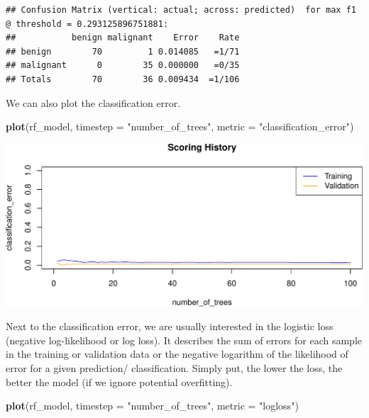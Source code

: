 \documentclass[]{article}
\newenvironment{Shaded}{\begin{snugshade}}{\end{snugshade}}
\newcommand{\KeywordTok}[1]{\textcolor[rgb]{0.13,0.29,0.53}{\textbf{{#1}}}}
\newcommand{\DataTypeTok}[1]{\textcolor[rgb]{0.13,0.29,0.53}{{#1}}}
\newcommand{\StringTok}[1]{\textcolor[rgb]{0.31,0.60,0.02}{{#1}}}
\newcommand{\NormalTok}[1]{{#1}}
\begin{document}
\begin{verbatim}
## Confusion Matrix (vertical: actual; across: predicted)  for max f1 @ threshold = 0.293125896751881:
##           benign malignant    Error    Rate
## benign        70         1 0.014085   =1/71
## malignant      0        35 0.000000   =0/35
## Totals        70        36 0.009434  =1/106
\end{verbatim}

We can also plot the classification error.

\begin{Shaded}
\begin{Highlighting}[]
\KeywordTok{plot}\NormalTok{(rf_model,}
     \DataTypeTok{timestep =} \StringTok{"number_of_trees"}\NormalTok{,}
     \DataTypeTok{metric =} \StringTok{"classification_error"}\NormalTok{)}
\end{Highlighting}
\end{Shaded}

\begin{center}\includegraphics{webinar_code_files/figure-latex/unnamed-chunk-44-1} \end{center}

Next to the classification error, we are usually interested in the
logistic loss (negative log-likelihood or log loss). It describes the
sum of errors for each sample in the training or validation data or the
negative logarithm of the likelihood of error for a given prediction/
classification. Simply put, the lower the loss, the better the model (if
we ignore potential overfitting).

\begin{Shaded}
\begin{Highlighting}[]
\KeywordTok{plot}\NormalTok{(rf_model,}
     \DataTypeTok{timestep =} \StringTok{"number_of_trees"}\NormalTok{,}
     \DataTypeTok{metric =} \StringTok{"logloss"}\NormalTok{)}
\end{Highlighting}
\end{Shaded}
\end{document}
